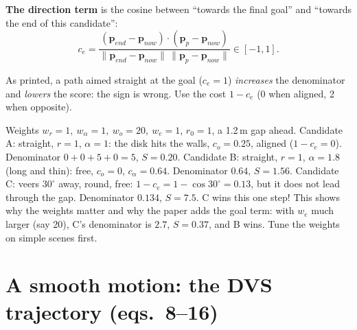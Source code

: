 \documentclass[11pt,a4paper]{article}
\newcommand{\vect}[1]{\mathbf{#1}}
\begin{document}
\textbf{The direction term} is the cosine between ``towards the final goal'' and ``towards the end of this candidate'':
\[
c_e=\frac{(\vect{p}_{end}-\vect{p}_{now})\cdot(\vect{p}_p-\vect{p}_{now})}{\|\vect{p}_{end}-\vect{p}_{now}\|\,\|\vect{p}_p-\vect{p}_{now}\|}\in[-1,1].
\]
\begin{watchbox}
As printed, a path aimed straight at the goal ($c_e=1$) \emph{increases} the denominator and \emph{lowers} the score:
the sign is wrong. Use the cost $1-c_e$ (0 when aligned, 2 when opposite).
\end{watchbox}

\begin{examplebox}
Weights $w_r=1,\ w_\alpha=1,\ w_o=20,\ w_e=1$, $r_0=1$, a 1.2\,m gap ahead.
Candidate A: straight, $r=1$, $\alpha=1$: the disk hits the walls, $c_o=0.25$, aligned ($1-c_e=0$). Denominator
$0+0+5+0=5$, $S=0.20$.
Candidate B: straight, $r=1$, $\alpha=1.8$ (long and thin): free, $c_o=0$, $c_\alpha=0.64$. Denominator $0.64$,
$S=1.56$.
Candidate C: veers $30^\circ$ away, round, free: $1-c_e=1-\cos30^\circ=0.13$, but it does not lead through the gap.
Denominator $0.134$, $S=7.5$. C wins this one step! This shows why the weights matter and why the paper adds the
goal term: with $w_e$ much larger (say 20), C's denominator is $2.7$, $S=0.37$, and B wins. Tune the weights on simple
scenes first.
\end{examplebox}

\section{A smooth motion: the DVS trajectory (eqs.~8--16)}\label{sec:traj}
\end{document}
